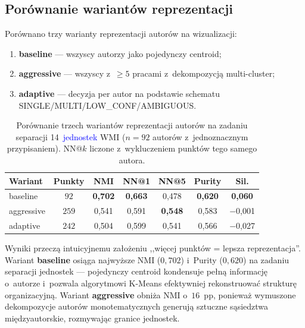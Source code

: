 \documentclass[a4paper,11pt,twocolumn]{article}
\newcommand{\hl}[1]{\textcolor{blue}{#1}}
\begin{document}
\subsection{Porównanie wariantów reprezentacji}

Porównano trzy warianty reprezentacji autorów na wizualizacji:
\begin{enumerate}
  \item \textbf{baseline} --- wszyscy autorzy jako pojedynczy centroid;
  \item \textbf{aggressive} --- wszyscy z~$\geq 5$ pracami z~dekompozycją
        multi-cluster;
  \item \textbf{adaptive} --- decyzja per autor na podstawie schematu
        SINGLE/MULTI/LOW\_CONF/AMBIGUOUS.
\end{enumerate}

\begin{table}[t]
\centering
\caption{Porównanie trzech wariantów reprezentacji autorów
na zadaniu separacji 14~\hl{jednostek} WMI ($n=92$ autorów
z~jednoznacznym przypisaniem). NN@$k$ liczone z~wykluczeniem punktów
tego samego autora.}
\label{tab:variants}
\small
\begin{tabular}{@{}lcccccc@{}}
\toprule
Wariant & Punkty & NMI & NN@1 & NN@5 & Purity & Sil. \\
\midrule
baseline   &  $92$ & \textbf{0{,}702} & \textbf{0{,}663} & 0{,}478 & \textbf{0{,}620} & \phantom{$-$}\textbf{0{,}060} \\
aggressive & $259$ & 0{,}541          & 0{,}591          & \textbf{0{,}548} & 0{,}583 & $-$0{,}001 \\
adaptive   & $242$ & 0{,}504          & 0{,}599          & 0{,}541 & 0{,}566 & $-$0{,}027 \\
\bottomrule
\end{tabular}
\end{table}

Wyniki przeczą intuicyjnemu założeniu ,,więcej punktów = lepsza
reprezentacja''. Wariant \textbf{baseline} osiąga najwyższe NMI
($0{,}702$) i~Purity ($0{,}620$) na zadaniu separacji jednostek ---
pojedynczy centroid kondensuje pełną informację o~autorze i~pozwala
algorytmowi K-Means efektywniej rekonstruować strukturę
organizacyjną. Wariant \textbf{aggressive} obniża NMI o~$16$~pp,
ponieważ wymuszone dekompozycje autorów monotematycznych generują
sztuczne sąsiedztwa międzyautorskie, rozmywając granice jednostek.
\end{document}
